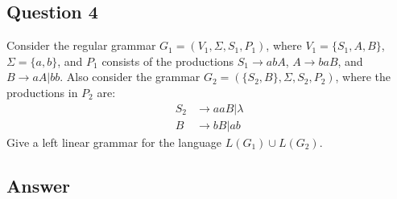 \newpage

\subsection*{Question 4}

\noindent [10 pts] Consider the regular grammar $G_1 = (V_1, \Sigma, S_1, P_1)$, where $V_1 = \{S_1, A, B\}$,
$\Sigma = \{a, b\}$, and $P_1$ consists of the productions $S_1 \rightarrow abA$, $A \rightarrow baB$, and 
$B \rightarrow aA | bb$. Also consider the grammar $G_2 = (\{S_2, B\}, \Sigma, S_2, P_2)$, where the productions
in $P_2$ are:
\begin{align*}
    S_2 &\rightarrow aaB | \lambda\\
    B &\rightarrow bB | ab
\end{align*}
\noindent Give a left linear grammar for the language $L(G_1) \cup L(G_2)$.

\subsection*{Answer}